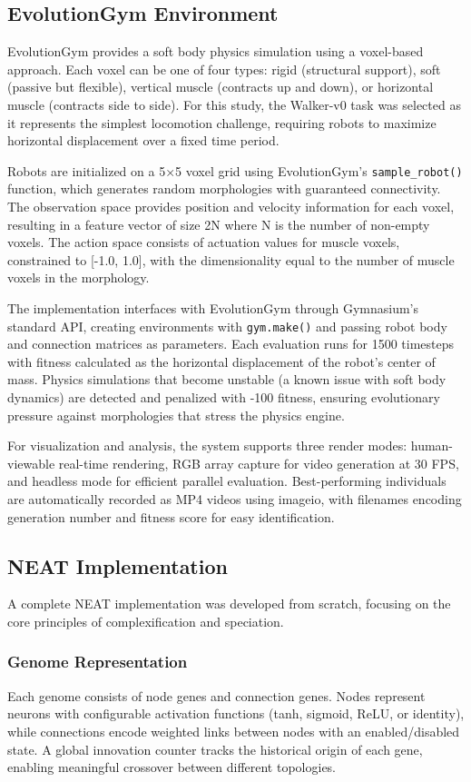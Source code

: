 \documentclass[conference]{IEEEtran}
\begin{document}
\subsection{EvolutionGym Environment}
EvolutionGym provides a soft body physics simulation using a voxel-based approach. Each voxel can be one of four types: rigid (structural support), soft (passive but flexible), vertical muscle (contracts up and down), or horizontal muscle (contracts side to side). For this study, the Walker-v0 task was selected as it represents the simplest locomotion challenge, requiring robots to maximize horizontal displacement over a fixed time period.

Robots are initialized on a 5×5 voxel grid using EvolutionGym's \texttt{sample\_robot()} function, which generates random morphologies with guaranteed connectivity. The observation space provides position and velocity information for each voxel, resulting in a feature vector of size 2N where N is the number of non-empty voxels. The action space consists of actuation values for muscle voxels, constrained to [-1.0, 1.0], with the dimensionality equal to the number of muscle voxels in the morphology.

The implementation interfaces with EvolutionGym through Gymnasium's standard API, creating environments with \texttt{gym.make()} and passing robot body and connection matrices as parameters. Each evaluation runs for 1500 timesteps with fitness calculated as the horizontal displacement of the robot's center of mass. Physics simulations that become unstable (a known issue with soft body dynamics) are detected and penalized with -100 fitness, ensuring evolutionary pressure against morphologies that stress the physics engine.

For visualization and analysis, the system supports three render modes: human-viewable real-time rendering, RGB array capture for video generation at 30 FPS, and headless mode for efficient parallel evaluation. Best-performing individuals are automatically recorded as MP4 videos using imageio, with filenames encoding generation number and fitness score for easy identification.


\subsection{NEAT Implementation}
A complete NEAT implementation was developed from scratch, focusing on the core principles of complexification and speciation.

\subsubsection{Genome Representation}
Each genome consists of node genes and connection genes. Nodes represent neurons with configurable activation functions (tanh, sigmoid, ReLU, or identity), while connections encode weighted links between nodes with an enabled/disabled state. A global innovation counter tracks the historical origin of each gene, enabling meaningful crossover between different topologies.
\end{document}
